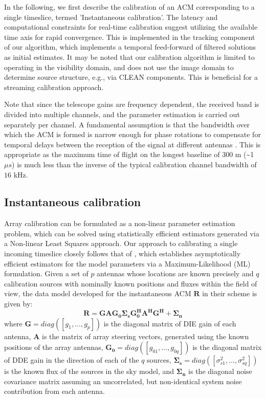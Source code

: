 \documentclass{aa}
\begin{document}
 In the  following,  we first  describe  the calibration  of an  ACM
corresponding to  a single  timeslice, termed 'Instantaneous  calibration'.  The
latency  and   computational  constraints  for   real-time  calibration  suggest
utilizing the available time axis  for rapid convergence. This is implemented in
the  tracking   component  of  our   algorithm,  which  implements   a  temporal
feed-forward of filtered  solutions as initial estimates.  It  may be noted that
our calibration algorithm is limited  to operating in the visibility domain, and
does not  use the image  domain to determine  source structure, e.g.,  via CLEAN
components. This is beneficial for a streaming calibration approach.

Note that since  the telescope gains are frequency  dependent, the received band
is divided into  multiple channels, and the parameter  estimation is carried out
separately per  channel.  A  fundamental assumption is  that the  bandwidth over
which the ACM  is formed is narrow enough for phase  rotations to compensate for
temporal  delays between  the  reception  of the  signal  at different  antennas
\citep{zatman1998narrow}.  This is appropriate as  the maximum time of flight on
the longest baseline of 300 m  (\textasciitilde{}1 $\mu s$) is much less than
the  inverse of  the typical  calibration channel  bandwidth of  $16$  kHz.



\subsection{Instantaneous calibration}

Array  calibration  can  be  formulated  as a  non-linear  parameter  estimation
problem, which can be  solved using statistically efficient estimators generated
via a  Non-linear Least Squares approach.  Our approach to  calibrating a single
incoming  timeslice closely  follows  that of  \citet{wijnholds2009multisource},
which establishes  asymptotically efficient estimators for  the model parameters
via a  Maximum-Likelihood (ML)  formulation. Given a  set of $p$  antennas whose
locations are known  precisely and $q$ calibration sources  with nominally known
positions and fluxes within the field  of view, the data model developed for the
instantaneous ACM $\mathbf{R}$ in their scheme is given by:
\begin{equation}
\mathbf{R=GAG_{0}\Sigma_{s}G_{0}^{H}A^{H}G^{H}+\Sigma_{n}}\label{eq:datamodel}
\end{equation}
where    \textbf{$\mathbf{G=}diag(\left[g_{1},\ldots,g_{p}\right])$    }is   the
diagonal matrix of DIE gain of each antenna, $\mathbf{A}$ is the matrix of array
steering vectors,  generated using  the known positions  of the  array antennas,
$\mathbf{G_{0}=}diag(\left[g_{01},\ldots,g_{0q}\right])$ is  the diagonal matrix
of   DDE   gain    in   the   direction   of   each    of   the   $q$   sources,
$\mathbf{\Sigma_{s}}=diag\left(\left[\sigma_{s1}^{2},\ldots,\sigma_{sq}^{2}\right]\right)$
is the known flux of the  sources in the sky model, and $\mathbf{\Sigma_{n}}$ is
the diagonal noise covariance matrix assuming an uncorrelated, but non-identical
system noise contribution from each antenna.
\end{document}
